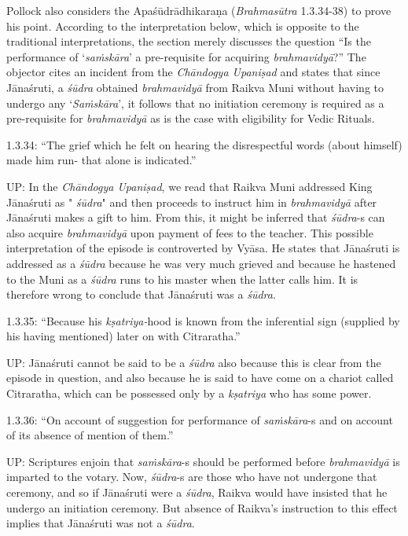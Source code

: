 
Pollock also considers the Apaśūdrādhikaraṇa (\textit{Brahmasūtra} 1.3.34-38) to prove his point. According to the interpretation below, which is opposite to the traditional interpretations, the section merely discusses the question “Is the performance of ‘\textit{saṁskāra}’ a pre-requisite for acquiring \textit{brahmavidyā}?” The objector cites an incident from the \textit{Chāndogya Upaniṣad} and states that since Jānaśruti, a \textit{śūdra} obtained \textit{brahmavidyā} from Raikva Muni without having to undergo any `\textit{Saṁskāra}', it follows that no initiation ceremony is required as a pre-requisite for \textit{brahmavidyā} as is the case with eligibility for Vedic Rituals.

1.3.34: “The grief which he felt on hearing the disrespectful words (about himself) made him run- that alone is indicated.”

UP: In the \textit{Chāndogya Upaniṣad}, we read that Raikva Muni addressed King Jānaśruti as "\textit{ śūdra}" and then proceeds to instruct him in \textit{brahmavidyā} after Jānaśruti makes a gift to him. From this, it might be inferred that \textit{śūdra}-s can also acquire \textit{brahmavidyā} upon payment of fees to the teacher. This possible interpretation of the episode is controverted by Vyāsa. He states that Jānaśruti is addressed as a \textit{śūdra} because he was very much grieved and because he hastened to the Muni as a \textit{śūdra} runs to his master when the latter calls him. It is therefore wrong to conclude that Jānaśruti was a \textit{śūdra}.

1.3.35: “Because his \textit{kṣatriya-}hood is known from the inferential sign (supplied by his having mentioned) later on with Citraratha.”

UP: Jānaśruti cannot be said to be a \textit{śūdra} also because this is clear from the episode in question, and also because he is said to have come on a chariot called Citraratha, which can be possessed only by a \textit{kṣatriya} who has some power.

1.3.36: “On account of suggestion for performance of \textit{saṁskāra}-s and on account of its absence of mention of them.”

UP: Scriptures enjoin that \textit{saṁskāra}-s should be performed before \textit{brahmavidyā} is imparted to the votary. Now, \textit{śūdra}-s are those who have not undergone that ceremony, and so if Jānaśruti were a \textit{śūdra}, Raikva would have insisted that he undergo an initiation ceremony. But absence of Raikva's instruction to this effect implies that Jānaśruti was not a \textit{śūdra}.

